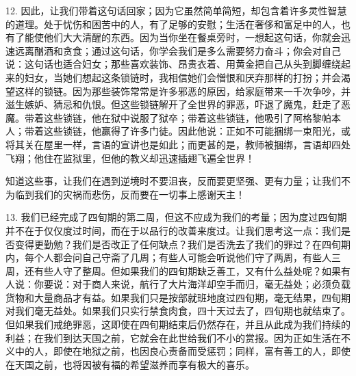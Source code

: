 12. 因此，让我们带着这句话回家；因为它虽然简单简短，却包含着许多灵性智慧的道理。处于忧伤和困苦中的人，有了足够的安慰；生活在奢侈和富足中的人，也有了能使他们大大清醒的东西。因为当你坐在餐桌旁时，一想起这句话，你就会迅速远离酗酒和贪食；通过这句话，你学会我们是多么需要努力奋斗；你会对自己说：这句话也适合妇女；那些喜欢装饰、昂贵衣着、用黄金把自己从头到脚缠绕起来的妇女，当她们想起这条锁链时，我相信她们会憎恨和厌弃那样的打扮；并会渴望这样的锁链。因为那些装饰常常是许多邪恶的原因，给家庭带来一千次争吵，并滋生嫉妒、猜忌和仇恨。但这些锁链解开了全世界的罪恶，吓退了魔鬼，赶走了恶魔。带着这些锁链，他在狱中说服了狱卒；带着这些锁链，他吸引了阿格黎帕本人；带着这些锁链，他赢得了许多门徒。因此他说：正如不可能捆绑一束阳光，或将其关在屋里一样，言语的宣讲也是如此；而更甚的是，教师被捆绑，言语却四处飞翔；他住在监狱里，但他的教义却迅速插翅飞遍全世界！\par

知道这些事，让我们在遇到逆境时不要沮丧，反而要更坚强、更有力量；让我们不为临到我们的灾祸而悲伤，反而要在一切事上感谢天主！\par

13. 我们已经完成了四旬期的第二周，但这不应成为我们的考量；因为度过四旬期并不在于仅仅度过时间，而在于以品行的改善来度过。让我们思考这一点：我们是否变得更勤勉？我们是否改正了任何缺点？我们是否洗去了我们的罪过？在四旬期内，每个人都会问自己守斋了几周；有些人可能会听说他们守了两周，有些人三周，还有些人守了整周。但如果我们的四旬期缺乏善工，又有什么益处呢？如果有人说：你要说：对于商人来说，航行了大片海洋却空手而归，毫无益处；必须负载货物和大量商品才有益。如果我们只是按部就班地度过四旬期，毫无结果，四旬期对我们毫无益处。如果我们只实行禁食肉食，四十天过去了，四旬期也就结束了。但如果我们戒绝罪恶，这即使在四旬期结束后仍然存在，并且从此成为我们持续的利益；在我们到达天国之前，它就会在此世给我们不小的赏报。因为正如生活在不义中的人，即使在地狱之前，也因良心责备而受惩罚；同样，富有善工的人，即使在天国之前，也将因被有福的希望滋养而享有极大的喜乐。\par

